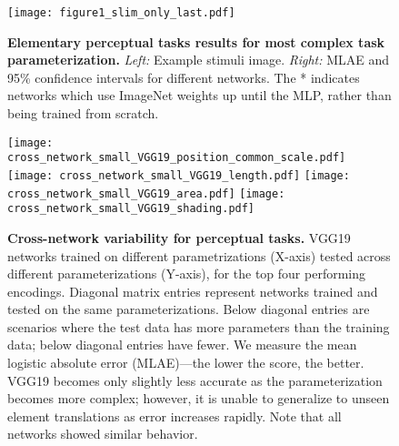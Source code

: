 \begin{figure}[p]
	\centering
	\texttt{[image: figure1\_slim\_only\_last.pdf]}
	\caption{\textbf{Elementary perceptual tasks results for most complex task parameterization.} \emph{Left:} Example stimuli image. \emph{Right:} MLAE and 95\% confidence intervals for different networks. The * indicates networks which use ImageNet weights up until the MLP, rather than being trained from scratch.}
	\label{fig:figure1_results}
\end{figure}


\begin{figure}[p]
	\centering
	  \texttt{[image: cross\_network\_small\_VGG19\_position\_common\_scale.pdf]}
	  \texttt{[image: cross\_network\_small\_VGG19\_length.pdf]}
	  \texttt{[image: cross\_network\_small\_VGG19\_area.pdf]}
	  \texttt{[image: cross\_network\_small\_VGG19\_shading.pdf]}
  \caption{\textbf{Cross-network variability for perceptual tasks.} VGG19 networks trained on different parametrizations (X-axis) tested across different parameterizations (Y-axis), for the top four performing encodings. Diagonal matrix entries represent networks trained and tested on the same parameterizations. Below diagonal entries are scenarios where the test data has more parameters than the training data; below diagonal entries have fewer. We measure the mean logistic absolute error (MLAE)---the lower the score, the better. VGG19 becomes only slightly less accurate as the parameterization becomes more complex; however, it is unable to generalize to unseen element translations as error increases rapidly. Note that all networks showed similar behavior.}
	\label{fig:cross_network}
\end{figure}

